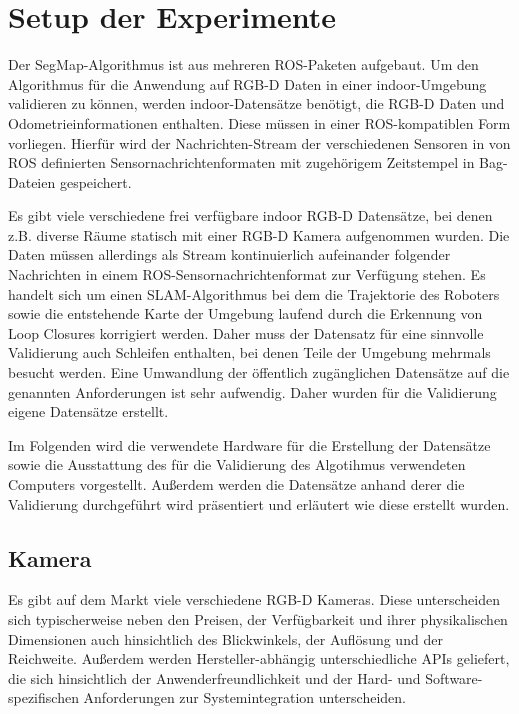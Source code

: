 \chapter[Setup der Experimente (Schmelzer)]{Setup der Experimente}

Der SegMap-Algorithmus ist aus mehreren ROS-Paketen aufgebaut. 
Um den Algorithmus für die Anwendung auf RGB-D Daten in einer indoor-Umgebung validieren zu können, werden indoor-Datensätze benötigt, die RGB-D Daten und Odometrieinformationen enthalten. Diese müssen in einer ROS-kompatiblen Form vorliegen. Hierfür wird der Nachrichten-Stream der verschiedenen Sensoren in von ROS definierten Sensornachrichtenformaten mit zugehörigem Zeitstempel in Bag-Dateien gespeichert. 

Es gibt viele verschiedene frei verfügbare indoor RGB-D Datensätze, bei denen z.B. diverse Räume statisch mit einer RGB-D Kamera aufgenommen wurden. Die Daten müssen allerdings als Stream kontinuierlich aufeinander folgender Nachrichten in einem ROS-Sensornachrichtenformat zur Verfügung stehen. Es handelt sich um einen SLAM-Algorithmus bei dem die Trajektorie des Roboters sowie die entstehende Karte der Umgebung laufend durch die Erkennung von Loop Closures korrigiert werden. Daher muss der Datensatz für eine sinnvolle Validierung auch Schleifen enthalten, bei denen Teile der Umgebung mehrmals besucht werden. Eine Umwandlung der öffentlich zugänglichen Datensätze auf die genannten Anforderungen  ist sehr aufwendig. Daher wurden für die Validierung eigene Datensätze erstellt. 

Im Folgenden wird die verwendete Hardware für die Erstellung der Datensätze sowie die Ausstattung des für die Validierung des Algotihmus verwendeten Computers vorgestellt. Außerdem werden die Datensätze anhand derer die Validierung durchgeführt wird präsentiert und erläutert wie diese erstellt wurden.

\section[Kamera (Kopp)]{Kamera}
\label{sec:kamera}

Es gibt auf dem Markt viele verschiedene RGB-D Kameras. Diese unterscheiden sich typischerweise neben den Preisen, der Verfügbarkeit und ihrer physikalischen Dimensionen auch hinsichtlich des Blickwinkels, der Auflösung und der Reichweite. Außerdem werden Hersteller-abhängig unterschiedliche APIs geliefert, die sich hinsichtlich der Anwenderfreundlichkeit und der Hard- und Software-spezifischen Anforderungen zur Systemintegration unterscheiden. 

